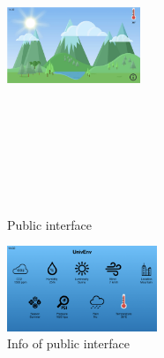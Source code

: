 \documentclass[12pt]{article} %
\begin{document}
\begin{itemize}
\begin{figure}[H]
  \centering
  \includegraphics[width=4cm,height=10cm,keepaspectratio]{img/p1.png}
  \caption{Public interface}
  \label{fig:boat1}
\end{figure}
\begin{figure}[H]
  \centering
  \includegraphics[width=0.4\textwidth]{img/p2.png}
  \caption{Info of public interface}
  \label{fig:boat2}
\end{figure}
\end{itemize}
\newpage
\end{document}
